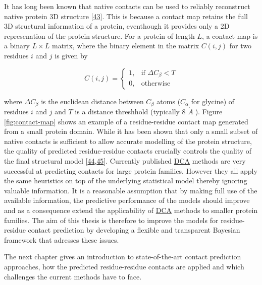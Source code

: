 \documentclass[11pt,a4paper,twoside]{book}
\newcommand{\Cb}{C_\beta}
\newcommand{\angstrom}{\mathring{A} \;}
\theoremstyle{definition}
\theoremstyle{definition}
\theoremstyle{remark}
\begin{document}
It has long been known that native contacts can be used to reliably
reconstruct native protein 3D structure
{[}\protect\hyperlink{ref-Vendruscolo1997}{43}{]}. This is because a
contact map retains the full 3D structural information of a protein,
eventhough it provides only a 2D represenation of the protein structure.
For a protein of length \(L\), a contact map is a binary \(L \times L\)
matrix, where the binary element in the matrix \(C(i,j)\) for two
residues \(i\) and \(j\) is given by

\begin{equation}
    C(i,j) =    
    \begin{cases}
        1, & \text{if } \Delta \Cb < T \\
        0, & \text{otherwise}
    \end{cases}
\end{equation}

where \(\Delta \Cb\) is the euclidean distance between \(\Cb\) atoms
(\(C_\alpha\) for glycine) of residues \(i\) and \(j\) and \(T\) is a
distance threshhold (typically 8 \(\angstrom\)). Figure
\ref{fig:contact-map} shows an example of a residue-residue contact map
generated from a small protein domain. While it has been shown that only
a small subset of native contacts is sufficient to allow accurate
modelling of the protein structure, the quality of predicted
residue-residue contacts crucially controls the quality of the final
structural model
{[}\protect\hyperlink{ref-Kim2014}{44},\protect\hyperlink{ref-Duarte2010}{45}{]}.
Currently published \protect\hyperlink{abbrev}{DCA} methods are very
successful at predicting contacts for large protein families. However
they all apply the same heuristics on top of the underlying statistical
model thereby ignoring valuable information. It is a reasonable
assumption that by making full use of the available information, the
predictive performance of the models should improve and as a consequence
extend the applicability of \protect\hyperlink{abbrev}{DCA} methods to
smaller protein families. The aim of this thesis is therefore to improve
the models for residue-residue contact prediction by developing a
flexible and transparent Bayesian framework that adresses these issues.

The next chapter gives an introduction to state-of-the-art contact
prediction approaches, how the predicted residue-residue contacts are
applied and which challenges the current methods have to face.
\end{document}
